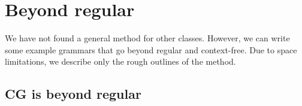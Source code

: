 \documentclass[11pt]{article}
\def\t#1{\texttt{#1}}
\begin{document}








\section{Beyond regular}

We have not found a general method for other classes. 
However, we can write some example grammars that go beyond regular and context-free.
Due to space limitations, we describe only the rough outlines of the method.

\subsection{CG is beyond regular}
\end{document}
